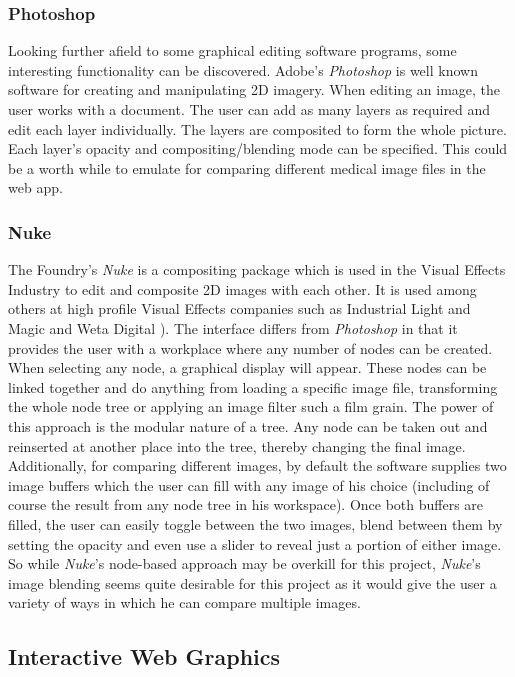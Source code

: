 \documentclass[a4paper,11pt,titlepage]{article}
\begin{document}
\subsubsection{Photoshop}
Looking further afield to some graphical editing software programs, some interesting functionality can be discovered. Adobe's \textit{Photoshop} is well known software for creating and manipulating 2D imagery. When editing an image, the user works with a document. The user can add as many layers as required and edit each layer individually. The layers are composited to form the whole picture. Each layer's opacity and compositing/blending mode can be specified. This could be a worth while to emulate for comparing different medical image files in the web app.



\subsubsection{Nuke}
The Foundry's \textit{Nuke} is a compositing package which is used in the Visual Effects Industry to edit and composite 2D images with each other. It is used among others at high profile Visual Effects companies such as Industrial Light and Magic and Weta Digital\cite{nuke1} \cite{nuke2}). The interface differs from \textit{Photoshop} in that it provides the user with a workplace where any number of nodes can be created. When selecting any node, a graphical display will appear. These nodes can be linked together and do anything from loading a specific image file, transforming the whole node tree or applying an image filter such a film grain. The power of this approach is the modular nature of a tree. Any node can be taken out and reinserted at another place into the tree, thereby changing the final image. Additionally, for comparing different images, by default the software supplies two image buffers which the user can fill with any image of his choice (including of course the result from any node tree in his workspace). Once both buffers are filled, the user can easily toggle between the two images, blend between them by setting the opacity and even use a slider to reveal just a portion of either image. So while \textit{Nuke}'s node-based approach may be overkill for this project, \textit{Nuke}'s image blending seems quite desirable for this project as it would give the user a variety of ways in which he can compare multiple images. 




\subsection{Interactive Web Graphics}
\end{document}
